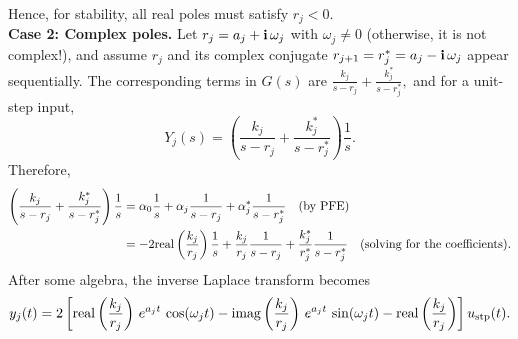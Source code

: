 Hence, for stability, all real poles must satisfy $r_j <0$.\\

\textbf{Case 2: Complex poles.}  
Let \(r_j = a_j + \mathop{\bm{\mathrm i}} \omega_j\) with $\omega_j \neq 0$ (otherwise, it is not complex!), and assume \(r_j\) and its complex conjugate \(r_{j+1} =r_j^\ast = a_j - \mathop{\bm{\mathrm i}} \omega_j\) appear sequentially. The corresponding terms in \(G(s)\) are
\(
\frac{k_j}{s - r_j} + \frac{k_j^\ast}{s - r_j^\ast},
\)
and for a unit-step input, 
$$Y_j(s) = \left( \frac{k_j}{s - r_j} + \frac{k_j^\ast}{s - r_j^\ast} \right) \frac{1}{s}. $$
Therefore, 
\[
\begin{aligned}
 \left( \frac{k_j}{s - r_j} + \frac{k_j^\ast}{s - r_j^\ast} \right) \frac{1}{s}  &= \alpha_0 \frac{1}{s} + \alpha_j \frac{1}{s - r_j}  + \alpha_j^\ast \frac{1}{s - r_j^\ast}~~~(\text{by PFE})\\
 &= -2 \mathrm{real} \left( \frac{k_j}{r_j}  \right) \frac{1}{s} + \frac{k_j}{r_j} \frac{1}{s - r_j} + \frac{k_j^\ast}{r_j^\ast} \frac{1}{s - r_j^\ast}~~~(\text{solving for the coefficients}).
\end{aligned}
\]
After some algebra, the inverse Laplace transform becomes
\[
y_j(t) = 2  \left[ \mathrm{real} \left( \frac{k_j}{r_j} \right) \, e^{a_j t} \,\cos(\omega_j t) -  \mathrm{imag} \left( \frac{k_j}{r_j} \right) \, e^{a_j t} \,\sin(\omega_j t) - \mathrm{real} \left( \frac{k_j}{r_j}  \right) \right] u_{\rm stp}(t).
\]

